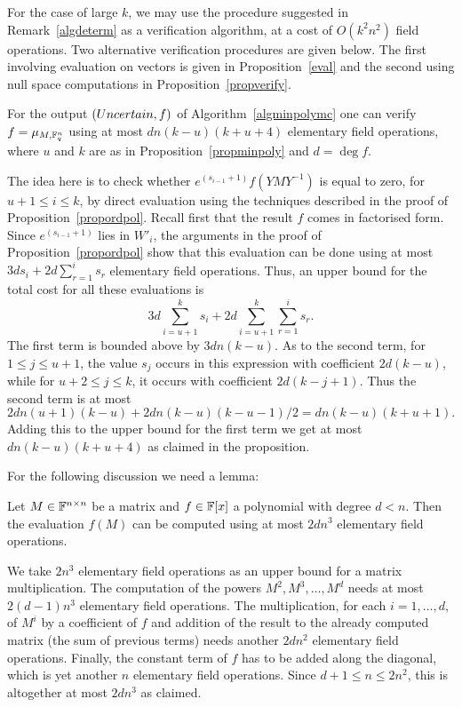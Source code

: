 \medskip
For the case of large $k$, we may use the procedure suggested in
Remark~\ref{algdeterm} as a verification algorithm, at a cost of
$O(k^2n^2)$ field operations. Two alternative verification procedures
%
are given below. The first involving evaluation on vectors is given in
Proposition~\ref{eval} and the second using null space computations
in Proposition~\ref{propverify}.

\begin{Prop}\label{eval}
%
    For the output $(\textsc{Uncertain},f)$ of Algorithm~\ref{algminpolymc} 
    one can verify $f = \mu_{M,\mathbb{F}_q^n}$ using
    at most $dn(k-u)(k+u+4)$ elementary field operations, where $u$ and
    $k$ are as in Proposition~\ref{propminpoly} and $d = \deg f$.
\end{Prop}
\proofbeg
The idea here is to check whether $e^{(s_{i-1}+1)} f(YMY^{-1})$ is equal to zero, for 
$u+1 \le i \le k$,
by direct evaluation using the techniques described in
the proof of Proposition~\ref{propordpol}. Recall first that the
result $f$ comes in factorised form. Since $e^{(s_{i-1}+1)}$ lies
in $W'_i$, the arguments in the proof of Proposition~\ref{propordpol}
show that this evaluation can be done using at most
$3d s_i + 2d \sum_{r=1}^i s_r$ elementary field operations. Thus, an
upper bound for the total cost for all these evaluations is
\[ 3d \sum_{i=u+1}^k s_i + 2d \sum_{i=u+1}^k \sum_{r=1}^i s_r. \]
The first term is bounded above by $3dn(k-u)$. As to the second
term, for $1 \le j \le u+1$, the value $s_j$ occurs in this expression
with coefficient $2d(k-u)$, while for $u+2 \le j \le k$, it occurs
with coefficient $2d(k-j+1)$. Thus the second term is at most
\[ 
2dn(u+1)(k-u) + 2dn(k-u)(k-u-1)/2 = dn(k-u)(k+u+1). 
\]
Adding this to the upper bound for the first term we get at most
$dn(k-u)(k+u+4)$ as claimed in the proposition.
\proofend

\pagebreak
\medskip
For the following discussion we need a lemma:

\begin{Lemm}
\label{costpolyeval}
Let $M \in \mathbb{F}^{n \times n}$ be a matrix and $f \in \mathbb{F}[x]$ a polynomial 
with degree $d < n$. Then the evaluation $f(M)$ can be computed using
at most $2dn^3$ elementary field operations.
\end{Lemm}

\proofbeg We take $2n^3$ elementary field operations as an upper bound for a matrix
multiplication. The computation of the powers $M^2, M^3, \ldots, M^d$
needs at most $2(d-1)n^3$ elementary field operations. The
multiplication, for each $i=1,\dots,d$, of $M^i$ by a coefficient of $f$
and addition of the result to the already computed matrix (the sum of previous terms) 
needs another $2dn^2$ elementary field operations. Finally, the
constant term of $f$ has to be added along the diagonal, which is yet
another $n$ elementary field operations. Since $d+1\le n \le 2 n^2$, 
this is altogether at most $2dn^3$
as claimed.
\proofend


